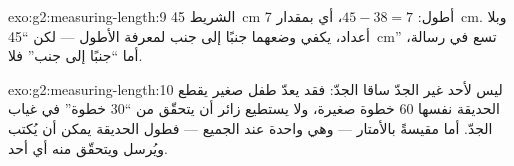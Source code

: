 \begin{solution}{exo:g2:measuring-length:9}
الشريط \qty{45}{cm} أطول: $45 - 38 = 7$، أي بمقدار \qty{7}{cm}.
وبلا أعداد، يكفي وضعهما جنبًا إلى جنب لمعرفة الأطول --- لكن
``\qty{45}{cm}'' تسع في رسالة، أما ``جنبًا إلى جنب'' فلا.
\end{solution}

\begin{solution}{exo:g2:measuring-length:10}
ليس لأحد غير الجدّ ساقا الجدّ: فقد يعدّ طفل صغير يقطع الحديقة
نفسها $60$ خطوة صغيرة، ولا يستطيع زائر أن يتحقّق من ``$30$
خطوة'' في غياب الجدّ. أما مقيسةً بالأمتار --- وهي واحدة عند
الجميع --- فطول الحديقة يمكن أن يُكتب ويُرسل ويتحقّق منه أي
أحد.
\end{solution}
